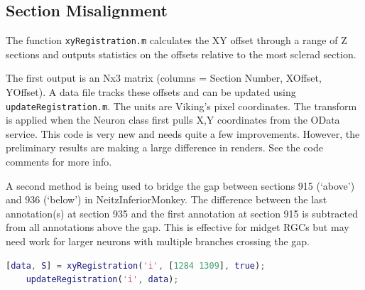 \documentclass[12pt]{exam}
\begin{document}
	\subsection{Section Misalignment}

	The function \texttt{xyRegistration.m} calculates the XY offset through a range of Z sections and outputs statistics on the offsets relative to the most sclerad section. 
	
	The first output is an Nx3 matrix (columns = Section Number, XOffset, YOffset). A data file tracks these offsets and can be updated using \texttt{updateRegistration.m}. The units are Viking's pixel coordinates. The transform is applied when the Neuron class first pulls X,Y coordinates from the OData service. This code is very new and needs quite a few improvements. However, the preliminary results are making a large difference in renders. See the code comments for more info.

	A second method is being used to bridge the gap between sections 915 (`above') and 936 (`below') in NeitzInferiorMonkey. The difference between the last annotation(s) at section 935 and the first annotation at section 915 is subtracted from all annotations above the gap. This is effective for midget RGCs but may need work for larger neurons with multiple branches crossing the gap.
	\begin{lstlisting}[language=matlab]
	[data, S] = xyRegistration('i', [1284 1309], true);
	updateRegistration('i', data);\end{lstlisting}
\end{document}
